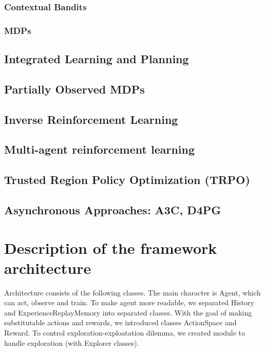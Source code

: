 \documentclass{article}
\begin{document}
\subsubsection{Contextual Bandits}

\subsubsection{MDPs}

\subsection{Integrated Learning and Planning}

\subsection{Partially Observed MDPs}

\subsection{Inverse Reinforcement Learning}

\subsection{Multi-agent reinforcement learning}

\subsection{Trusted Region Policy Optimization (TRPO)}

\subsection{Asynchronous Approaches: A3C, D4PG}


\section{Description of the framework architecture}

Architecture consists of the following classes. The main character is
Agent, which can act, observe and train.
To make agent more readable, we separated History and
ExperienceReplayMemory into separated classes.
With the goal of making substitutable actions and rewards,
we introduced classes ActionSpace and Reward.
To control exploration-exploatation dilemma, we created module to
handle exploration (with Explorer classes).
\end{document}
